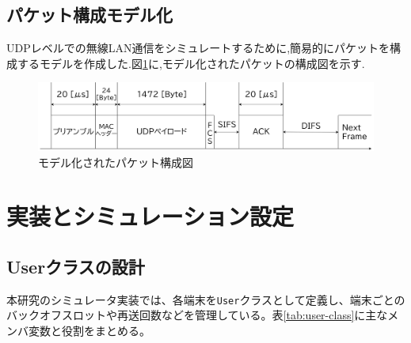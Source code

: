 \documentclass[a4paper, 10pt]{ltjsarticle}
\begin{document}
\subsection{パケット構成モデル化}

UDPレベルでの無線LAN通信をシミュレートするために,簡易的にパケットを構成するモデルを作成した.図\ref{packet}に,モデル化されたパケットの構成図を示す.

\begin{figure}[H]
  \centering
  \includegraphics[width=1\columnwidth]{./assets/packet.png}
  \caption{モデル化されたパケット構成図}
  \label{packet}
\end{figure}



\section{実装とシミュレーション設定}
\subsection{Userクラスの設計}
本研究のシミュレータ実装では、各端末を\texttt{User}クラスとして定義し、端末ごとのバックオフスロットや再送回数などを管理している。表\ref{tab:user-class}に主なメンバ変数と役割をまとめる。
\end{document}
